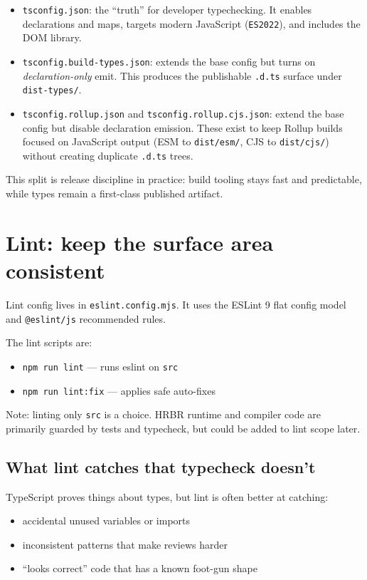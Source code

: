 \begin{itemize}
\item \texttt{tsconfig.json}: the ``truth'' for developer typechecking.
It enables declarations and maps, targets modern JavaScript (\texttt{ES2022}), and includes the DOM library.
\item \texttt{tsconfig.build-types.json}: extends the base config but turns on \emph{declaration-only} emit.
This produces the publishable \texttt{.d.ts} surface under \texttt{dist-types/}.
\item \texttt{tsconfig.rollup.json} and \texttt{tsconfig.rollup.cjs.json}: extend the base config but disable declaration emission.
These exist to keep Rollup builds focused on JavaScript output (ESM to \texttt{dist/esm/}, CJS to \texttt{dist/cjs/}) without creating duplicate \texttt{.d.ts} trees.
\end{itemize}

This split is release discipline in practice: build tooling stays fast and predictable, while types remain a first-class published artifact.

\section{Lint: keep the surface area consistent}

Lint config lives in \texttt{eslint.config.mjs}.
It uses the ESLint 9 flat config model and \texttt{@eslint/js} recommended rules.

The lint scripts are:

\begin{itemize}
\item \texttt{npm run lint} --- runs eslint on \texttt{src}
\item \texttt{npm run lint:fix} --- applies safe auto-fixes
\end{itemize}

Note: linting only \texttt{src} is a choice. HRBR runtime and compiler code are primarily guarded by tests and typecheck, but could be added to lint scope later.

\subsection{What lint catches that typecheck doesn't}

TypeScript proves things about types, but lint is often better at catching:

\begin{itemize}
\item accidental unused variables or imports
\item inconsistent patterns that make reviews harder
\item ``looks correct'' code that has a known foot-gun shape
\end{itemize}

